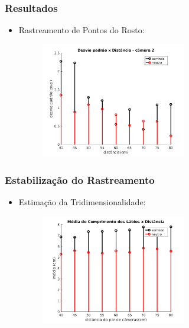 \documentclass[brazil]{beamer}
\begin{document}
\begin{frame}
\frametitle{Resultados}
  \begin{itemize}
      \item Rastreamento de Pontos do Rosto:
      
       \begin{figure}
        \centering
        \includegraphics[width = 0.6\textwidth, keepaspectratio]{./img/desvio_cameraDireita.jpg}
      \end{figure}
          
  \end{itemize} 
\end{frame}

\begin{frame}
\frametitle{Estabilização do Rastreamento}
  \begin{itemize}
      \item Estimação da Tridimensionalidade:
      \begin{figure}
        \centering
        \includegraphics[width = 0.6\textwidth, keepaspectratio]{./img/media_3d.png}
      \end{figure}
               
  \end{itemize} 
\end{frame}
\end{document}
